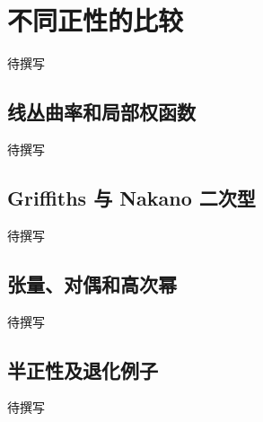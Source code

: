 
% 
% 

\section{不同正性的比较}
\label{g4:sec:1801}

待撰写

\subsection{线丛曲率和局部权函数}
\label{g4:subsec:1801:01}
待撰写

\subsection{Griffiths 与 Nakano 二次型}
\label{g4:subsec:1801:02}
待撰写

\subsection{张量、对偶和高次幂}
\label{g4:subsec:1801:03}
待撰写

\subsection{半正性及退化例子}
\label{g4:subsec:1801:04}
待撰写
